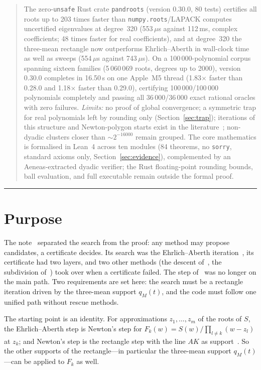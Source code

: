 \documentclass[10pt,a4paper]{article}
\theoremstyle{definition}
\numberwithin{equation}{section}
\begin{document}
\begin{quote}
The zero-\texttt{unsafe} Rust crate \texttt{pandroots} (version 0.30.0, 80 tests) certifies all roots up to 203 times faster than \texttt{numpy.roots}/LAPACK computes uncertified eigenvalues at degree~320 (553\,$\mu$s against 112\,ms, complex coefficients; 48 times faster for real coefficients), and at degree~320 the three-mean rectangle now outperforms Ehrlich--Aberth in wall-clock time as well as sweeps (554\,$\mu$s against 743\,$\mu$s). On a 100\,000-polynomial corpus spanning sixteen families (5\,060\,069 roots, degrees up to 2000), version 0.30.0 completes in 16.50\,s on one Apple~M5 thread (1.83$\times$ faster than 0.28.0 and 1.18$\times$ faster than 0.29.0), certifying 100\,000/100\,000 polynomials completely and passing all 36\,000/36\,000 exact rational oracles with zero failures.
\emph{Limits:} no proof of global convergence; a symmetric trap for real polynomials left by rounding only (Section~\ref{sec:trap}); iterations of this structure and Newton-polygon starts exist in the literature~\cite{hpr,ppz,prp,bini}; non-dyadic clusters closer than $\sim 2^{-16000}$ remain grouped. The core mathematics is formalised in Lean~4 across ten modules (84 theorems, no \texttt{sorry}, standard axioms only, Section~\ref{sec:evidence}), complemented by an Aeneas-extracted dyadic verifier; the Rust floating-point rounding bounds, ball evaluation, and full executable remain outside the formal proof.
\end{quote}

\vspace{2pt}\noindent\textcolor{slatec!40}{\rule{\linewidth}{0.5pt}}

\section{Purpose}\label{sec:purpose}
The note~\cite{g7} separated the search from the proof: any method may propose candidates, a certificate decides. Its search was the Ehrlich--Aberth iteration~\cite{ehrlich,aberth}, its certificate had two layers, and two other methods (the descent of~\cite{g3}, the subdivision of~\cite{g6}) took over when a certificate failed. The step of~\cite{v31,g2} was no longer on the main path. Two requirements are set here: the search must be a rectangle iteration driven by the three-mean support $q_M(t)$, and the code must follow one unified path without rescue methods.

The starting point is an identity. For approximations $z_1,\dots,z_m$ of the roots of $S$, the Ehrlich--Aberth step is Newton's step for $F_k(w)=S(w)/\prod_{l\ne k}(w-z_l)$ at $z_k$; and Newton's step is the rectangle step with the line $AK$ as support~\cite{v31,g2}. So the other supports of the rectangle---in particular the three-mean support $q_M(t)$---can be applied to $F_k$ as well.
\end{document}
